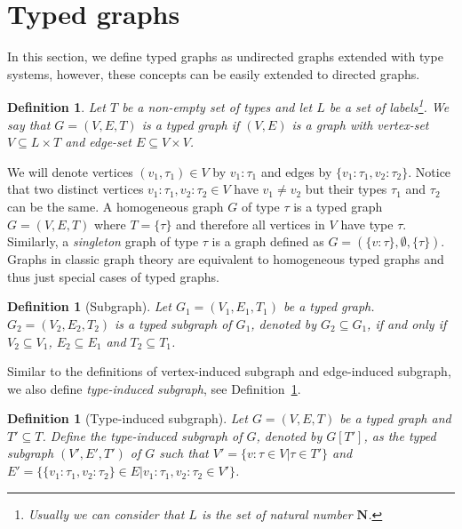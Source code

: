 \documentclass[preprint,12pt]{elsarticle}
\theoremstyle{plain}
\newtheorem{definition}[theorem]{Definition}
\newcommand\tyv[2]{#1\!\!:\!\!#2}
\newcommand\subgraph{\subseteq}
\begin{document}
\section{Typed graphs}

In this section, we define typed graphs as undirected graphs extended with type systems,
however, these concepts can be easily extended to directed graphs.

\begin{definition}
Let $T$ be a non-empty set of types
and let $L$ be a set of labels\footnote{Usually we can consider that $L$ is the set of
natural number $\mathbf{N}$.}.
We say that $G = (V,E,T)$ is a typed graph if $(V,E)$ is a graph with
vertex-set $V \subseteq L\times T$ and edge-set $E \subseteq V\times V$.
\end{definition}

We will denote vertices $(v_1, \tau_1) \in V$ by $\tyv{v_1}{\tau_1}$ and edges by $\{\tyv{v_1}{\tau_1}, \tyv{v_2}{\tau_2}\}$.
Notice that two distinct vertices $\tyv{v_1}{\tau_1}, \tyv{v_2}{\tau_2} \in V$ have $v_1 \neq v_2$ but their types $\tau_1$ and $\tau_2$ can be the same.
A homogeneous graph $G$ of type $\tau$ is a typed graph $G = (V,E,T)$ where $T = \{\tau\}$ and therefore all vertices in $V$ have type $\tau$.
Similarly, a \textit{singleton} graph of type $\tau$ is a graph defined as $G = (\{\tyv{v}{\tau}\}, \emptyset, \{\tau\})$.
Graphs in classic graph theory are equivalent to homogeneous typed graphs and thus just special cases of typed graphs.

\begin{definition}[Subgraph]
Let $G_1 = (V_1,E_1,T_1)$ be a typed graph.
$G_2 = (V_2,E_2,T_2)$ is a typed subgraph of $G_1$,
denoted by $G_2 \subgraph G_1$,
if and only if $V_2 \subseteq V_1$,
$E_2 \subseteq E_1$ and $T_2 \subseteq T_1$.
\end{definition}

Similar to the definitions of vertex-induced subgraph and
edge-induced subgraph, we also define \textit{type-induced subgraph},
see Definition~\ref{def:typeindsubgraph}.

\begin{definition}[Type-induced subgraph]\label{def:typeindsubgraph}
Let $G = (V,E,T)$ be a typed graph
and $T'\subseteq T$.
Define the type-induced subgraph of $G$,
denoted by $G[T']$, as the typed subgraph $(V',E',T')$
of $G$ such that
$V' = \{ \tyv{v}{\tau}\in V| \tau\in T'\}$
and
$E' = \{\{\tyv{v_1}{\tau_1}, \tyv{v_2}{\tau_2}\}\in E| \tyv{v_1}{\tau_1}, \tyv{v_2}{\tau_2}\in V'\}$.
\end{definition}
\end{document}
